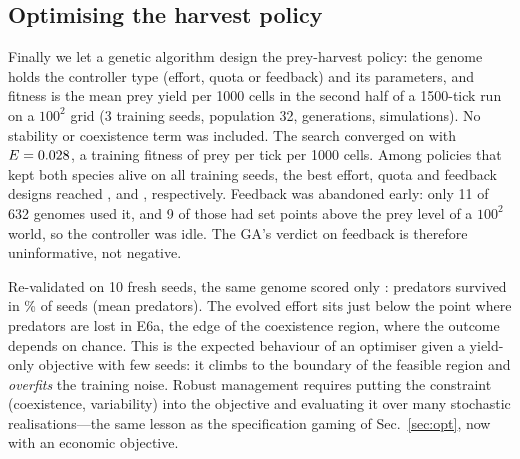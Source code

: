 \subsection{Optimising the harvest policy}\label{sec:yield}
Finally we let a genetic algorithm design the prey-harvest policy: the genome holds the controller type
(effort, quota or feedback) and its parameters, and fitness is the mean prey yield per 1000 cells in the
second half of a 1500-tick run on a $100^2$ grid (3 training seeds, population 32, \Ygens{} generations,
\Yevals{} simulations). No stability or coexistence term was included. The search converged on
\YmodeName{} with $E=0.028$, a training fitness of \Ytrain{} prey per tick per 1000 cells. Among
policies that kept both species alive on all training seeds, the best effort, quota and feedback designs
reached \YbestEff, \YbestQuo{} and \YbestFb{}, respectively. Feedback was abandoned early: only 11 of
632 genomes used it, and 9 of those had set points above the prey level of a $100^2$ world, so the
controller was idle. The GA's verdict on feedback is therefore uninformative, not negative.

Re-validated on 10 fresh seeds, the same genome scored only \Yval{}: predators survived in \Ycoex\% of
seeds (mean \YmeanPred{} predators). The evolved effort sits just below the point where predators are lost
in E6a, the edge of the coexistence region, where the outcome depends on chance. This is the expected
behaviour of an optimiser given a yield-only objective with few seeds: it climbs to the boundary of the
feasible region and \emph{overfits} the training noise. Robust management requires putting the constraint
(coexistence, variability) into the objective and evaluating it over many stochastic realisations---the
same lesson as the specification gaming of Sec.~\ref{sec:opt}, now with an economic objective.
